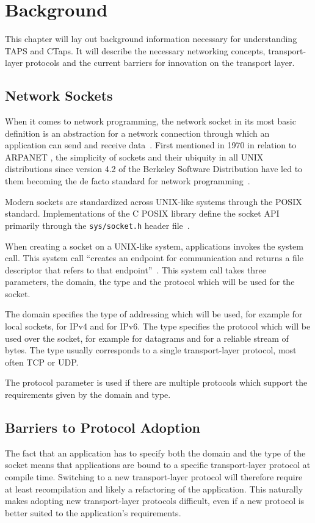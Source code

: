 \chapter{Background}\label{chap:background}
This chapter will lay out background information necessary
for understanding TAPS and CTaps.
It will describe the necessary networking concepts,
transport-layer protocols and the current barriers
for innovation on the transport layer.

\section{Network Sockets}
When it comes to network programming,
the network socket in its most basic definition is an abstraction
for a network connection through which an application can send
and receive data~\cite[p. 8]{donahooTCPIPSockets2009}. 
First mentioned in 1970 in relation to ARPANET \cite{rfc33}, the
simplicity of sockets and their ubiquity in all UNIX distributions
since version 4.2 of the Berkeley Software Distribution have
led to them becoming the de facto standard for network
programming~\cite[p.~502]{tanenbaumComputerNetworks2011}.

Modern sockets are standardized across UNIX-like systems through
the POSIX standard. Implementations of the C POSIX library define
the socket API primarily through the \texttt{sys/socket.h} header file~\cite{posix:2024:socket}.

When creating a socket on a UNIX-like system, applications
invokes the  system call. This system call
\enquote{creates an endpoint for communication and returns a file 
descriptor that refers to that endpoint}~\cite{Socket2LinuxManual}.
This system call takes three parameters, the domain, the type
and the protocol which will be used for the socket.

The domain specifies the type of
addressing which will be used, for example 
for local sockets,  for IPv4 and 
for IPv6. The type specifies the protocol which will be used over the socket, for
example  for datagrams and 
for a reliable stream of bytes. The type usually corresponds to a
single transport-layer protocol, most often TCP or UDP.

The protocol parameter is used if there are multiple protocols
which support the requirements given by the domain and type.

\section{Barriers to Protocol Adoption}\label{sec:transport-protocol-barriers}
The fact that an application has to specify both the domain
and the type of the socket means that applications are bound to a specific
transport-layer protocol at compile time.
Switching to a new transport-layer protocol will therefore require at least recompilation and 
likely a refactoring of the application. 
This naturally makes adopting new transport-layer protocols difficult, even
if a new protocol is better suited to the application's requirements.

